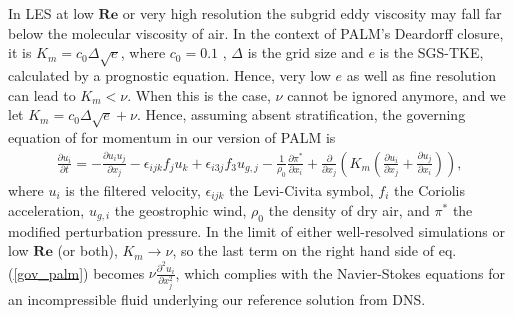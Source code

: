 \documentclass[smallcondensed,draft]{svjour3} %
\newcommand{\RE}{\mathbf{Re}}
\begin{document}
In LES at low $\RE$ or very high resolution the subgrid eddy viscosity may fall far below the molecular viscosity of air. In the context of PALM's Deardorff closure, it is $K_m = c_0 \Delta \sqrt{e}$, where $c_0 = 0.1$ \citep{deardorff1980stratocumulus}, $\Delta$ is the grid size and $e$ is the SGS-TKE, calculated by a prognostic equation. Hence, very low $e$ as well as fine resolution can lead to $K_m<\nu$. When this is the case, $\nu$ cannot be ignored anymore, and we let $K_m = c_0 \Delta \sqrt{e} + \nu$. Hence, assuming absent stratification, the governing equation of for momentum in our version of PALM is
\begin{align}\label{gov_palm}
  \frac{\partial u_i}{\partial t} = - \frac{\partial u_i u_j}{\partial x_j} -\epsilon_{ijk}f_ju_k + \epsilon_{i3j} f_3 u_{g,j} - \frac{1}{\rho_0}\frac{\partial\pi^*}{\partial x_i} + \frac{\partial}{\partial x_j}\left( K_m\left(\frac{\partial u_i}{\partial x_j} + \frac{\partial u_j}{\partial x_i} \right)\right),
\end{align}
where $u_i$ is the filtered velocity, $\epsilon_{ijk}$ the Levi-Civita symbol, $f_i$ the Coriolis acceleration, $u_{g,i}$ the geostrophic wind, $\rho_0$ the density of dry air, and $\pi^*$ the modified perturbation pressure. In the limit of either well-resolved simulations or low $\RE$ (or both), $K_m \rightarrow \nu$, so the last term on the right hand side of eq. (\ref{gov_palm}) becomes $\nu\frac{\partial^2u_i}{\partial x_j^2}$, which complies with the Navier-Stokes equations for an incompressible fluid underlying our reference solution from DNS.

\label{low-bound}
\end{document}
